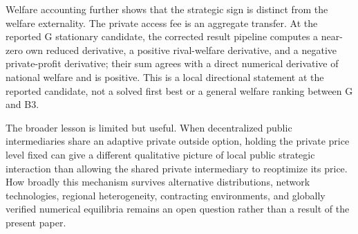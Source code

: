 Welfare accounting further shows that the strategic sign is distinct from the welfare externality. The private access fee is an aggregate transfer. At the reported G stationary candidate, the corrected result pipeline computes a near-zero own reduced derivative, a positive rival-welfare derivative, and a negative private-profit derivative; their sum agrees with a direct numerical derivative of national welfare and is positive. This is a local directional statement at the reported candidate, not a solved first best or a general welfare ranking between G and B3.

The broader lesson is limited but useful. When decentralized public intermediaries share an adaptive private outside option, holding the private price level fixed can give a different qualitative picture of local public strategic interaction than allowing the shared private intermediary to reoptimize its price. How broadly this mechanism survives alternative distributions, network technologies, regional heterogeneity, contracting environments, and globally verified numerical equilibria remains an open question rather than a result of the present paper.
